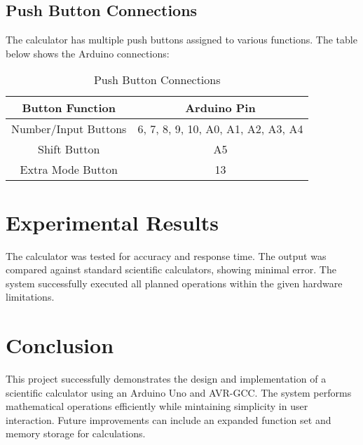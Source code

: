 \documentclass[a4paper,12pt]{article}
\begin{document}
\subsection{Push Button Connections}
The calculator has multiple push buttons assigned to various functions. The table below shows the Arduino connections:

\begin{table}[h]
    \centering
    \begin{tabular}{|c|c|}
        \hline
        Button Function & Arduino Pin \\ \hline
        Number/Input Buttons & 6, 7, 8, 9, 10, A0, A1, A2, A3, A4 \\ \hline
        Shift Button & A5 \\ \hline
        Extra Mode Button & 13 \\ \hline
    \end{tabular}
    \caption{Push Button Connections}
\end{table}
\section{Experimental Results}
The calculator was tested for accuracy and response time. The output was compared against standard scientific calculators, showing minimal error. The system successfully executed all planned operations within the given hardware limitations.

\section{Conclusion}
This project successfully demonstrates the design and implementation of a scientific calculator using an Arduino Uno and AVR-GCC. The system performs mathematical operations efficiently while mintaining simplicity in user interaction. Future improvements can include an expanded function set and memory storage for calculations.
\end{document}
